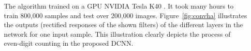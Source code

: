 
\noindent The algorithm trained on a GPU NVIDIA \cite{kirk2007nvidia} Tesla K40 \cite{lindholm2008nvidia}. It took many hours to train 800,000 samples and test over 200,000 images. Figure~\ref{fig:convha} illustrates the outputs (rectified responses of the shown filters) of the different layers in the network for one input sample. This illustration clearly depicts the process of even-digit counting in the proposed DCNN.  %

